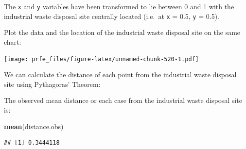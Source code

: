 \documentclass[12pt,a4paper]{book}
\newenvironment{Shaded}{\begin{snugshade}}{\end{snugshade}}
\newcommand{\KeywordTok}[1]{\textcolor[rgb]{0.13,0.29,0.53}{\textbf{#1}}}
\newcommand{\DataTypeTok}[1]{\textcolor[rgb]{0.13,0.29,0.53}{#1}}
\newcommand{\DecValTok}[1]{\textcolor[rgb]{0.00,0.00,0.81}{#1}}
\newcommand{\FloatTok}[1]{\textcolor[rgb]{0.00,0.00,0.81}{#1}}
\newcommand{\StringTok}[1]{\textcolor[rgb]{0.31,0.60,0.02}{#1}}
\newcommand{\OperatorTok}[1]{\textcolor[rgb]{0.81,0.36,0.00}{\textbf{#1}}}
\newcommand{\NormalTok}[1]{#1}
\theoremstyle{definition}
\theoremstyle{definition}
\theoremstyle{definition}
\theoremstyle{remark}
\begin{document}
The \texttt{x} and \texttt{y} variables have been transformed to lie
between 0 and 1 with the industrial waste disposal site centrally
located (i.e.~at \texttt{x} = 0.5, \texttt{y} = 0.5).

Plot the data and the location of the industrial waste disposal site on
the same chart:

\begin{Shaded}
\end{Shaded}

\texttt{[image: prfe\_files/figure-latex/unnamed-chunk-520-1.pdf]}

We can calculate the distance of each point from the industrial waste
disposal site using Pythagoras' Theorem:

\begin{Shaded}
\end{Shaded}

The observed mean distance or each case from the industrial waste
disposal site is:

\begin{Shaded}
\begin{Highlighting}[]
\KeywordTok{mean}\NormalTok{(distance.obs)}
\end{Highlighting}
\end{Shaded}

\begin{verbatim}
## [1] 0.3444118
\end{verbatim}
\end{document}
